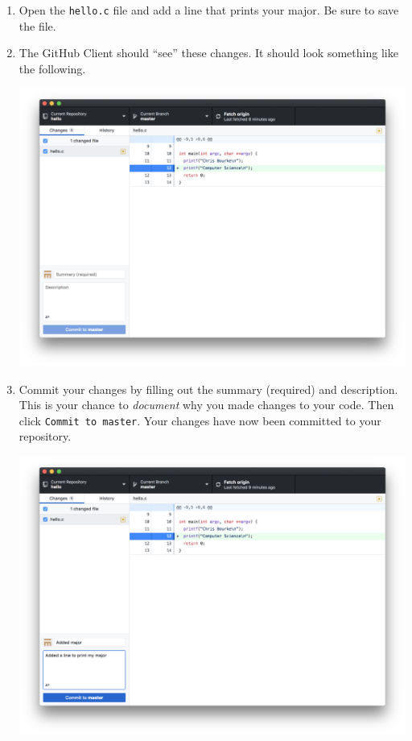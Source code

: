 \documentclass[12pt]{scrartcl}
\begin{document}
\begin{enumerate}
  \item Open the \texttt{hello.c} file and add a line that
  prints your major.  Be sure to save the file.

  \item The GitHub Client should ``see'' these changes.  It should look
  something like the following. 
  \begin{center}
  \includegraphics[scale=0.125]{./hack1.0-files/change.png}
  \end{center}

  \item Commit your changes by filling out the summary (required) and description.
  This is your chance to \emph{document} why you made changes to your code.
  Then click \texttt{Commit to master}.  Your changes have now
  been committed to your repository.  
  \begin{center}
  \includegraphics[scale=0.125]{./hack1.0-files/commit.png}
  \end{center}
  

\end{enumerate}
\end{document}
